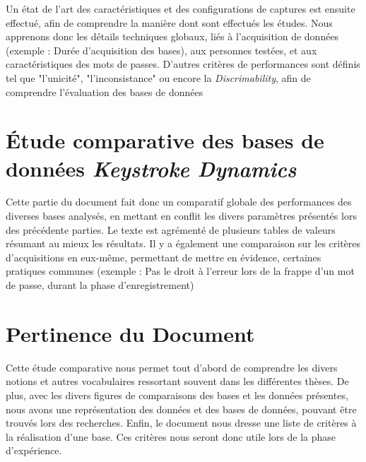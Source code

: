 \documentclass[a4paper,11pt]{article}
\begin{document}
Un état de l'art des caractéristiques et des configurations de captures est ensuite effectué, afin de comprendre la manière dont sont effectués les études.
Nous apprenons donc les détails techniques globaux, liés à l'acquisition de données (exemple : Durée d'acquisition des bases), aux personnes testées, et aux caractéristiques des mots de passes.
D'autres critères de performances sont  définis tel que "l'unicité", "l'inconsistance" ou encore la \textit{Discrimability}, afin de comprendre l'évaluation des bases de données

\section{Étude comparative des bases de données \textit{Keystroke Dynamics}}

Cette partie du document fait donc un comparatif globale des performances des diverses bases analysés, en mettant en conflit les divers paramètres présentés lors des précédente parties. Le texte est agrémenté de plusieurs tables de valeurs résumant au mieux les résultats.
Il y a également une comparaison sur les critères d'acquisitions en eux-même, permettant de mettre en évidence, certaines pratiques communes (exemple : Pas le droit à l'erreur lors de la frappe d'un mot de passe, durant la phase d'enregistrement)

\section{Pertinence du Document}

Cette étude comparative nous permet tout d'abord de comprendre les divers notions et autres vocabulaires ressortant souvent dans les différentes thèses.    
De plus, avec les divers figures de comparaisons des bases et les données présentes, nous avons une représentation des données et des bases de données, pouvant être trouvés lors des recherches.   
Enfin, le document nous dresse une liste de critères à la réalisation d'une base. Ces critères nous seront donc utile lors de la phase d'expérience.
\end{document}
